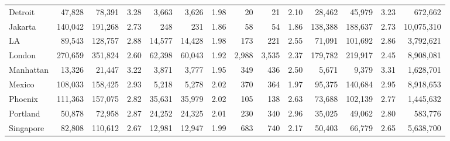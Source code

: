 \begin{table}[ht!]
\begin{adjustbox}{width=\textwidth,keepaspectratio}
\begin{tabular}{l|rrr|rrr|rrr|rrr|r}
			Detroit    & 47,828                          & 78,391                       & 3.28                      & 3,663                       & 3,626      & 1.98                & 20    & 21    & 2.10                & 28,462  & 45,979  & 3.23                  & 672,662    \\
			Jakarta    & 140,042                         & 191,268                      & 2.73                      & 248                         & 231        & 1.86                & 58    & 54    & 1.86                & 138,388 & 188,637 & 2.73                  & 10,075,310 \\
			LA         & 89,543                          & 128,757                      & 2.88                      & 14,577                      & 14,428     & 1.98                & 173   & 221   & 2.55                & 71,091  & 101,692 & 2.86                  & 3,792,621  \\
			London     & 270,659                         & 351,824                      & 2.60                      & 62,398                      & 60,043     & 1.92                & 2,988 & 3,535 & 2.37                & 179,782 & 219,917 & 2.45                  & 8,908,081  \\
			Manhattan  & 13,326                          & 21,447                       & 3.22                      & 3,871                       & 3,777      & 1.95                & 349   & 436   & 2.50                & 5,671   & 9,379   & 3.31                  & 1,628,701  \\
			Mexico     & 108,033                         & 158,425                      & 2.93                      & 5,218                       & 5,278      & 2.02                & 370   & 364   & 1.97                & 95,375  & 140,684 & 2.95                  & 8,918,653  \\
			Phoenix    & 111,363                         & 157,075                      & 2.82                      & 35,631                      & 35,979     & 2.02                & 105   & 138   & 2.63                & 73,688  & 102,139 & 2.77                  & 1,445,632  \\
			Portland   & 50,878                          & 72,958                       & 2.87                      & 24,252                      & 24,325     & 2.01                & 230   & 340   & 2.96                & 35,025  & 49,062  & 2.80                  & 583,776    \\
			Singapore  & 82,808                          & 110,612                      & 2.67                      & 12,981                      & 12,947     & 1.99                & 683   & 740   & 2.17                & 50,403  & 66,779  & 2.65                  & 5,638,700

\end{tabular}
\end{adjustbox}
\end{table}
